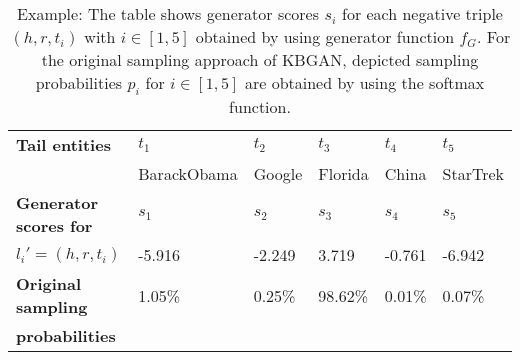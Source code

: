 \begin{table}[h]
    \centering
    \begin{tabular}{llllll}
        \toprule
        
        \textbf{Tail entities}
        & \textbf{$t_1$} & \textbf{$t_2$} & \textbf{$t_3$} & \textbf{$t_4$} & \textbf{$t_5$} \\
         
        & BarackObama 
        & Google 
        & Florida
        & China 
        & StarTrek \\

        \midrule
        
        \textbf{Generator scores for}
        & $s_1$ & $s_2$ & $s_3$ & $s_4$ & $s_5$ \\
       
        
        \textbf{$l_i' = (h, r, t_i)$}
        & -5.916 
        & -2.249  
        & 3.719 
        & -0.761 
        & -6.942 \\
        
         \midrule
        
        \textbf{Original sampling}
         & 1.05\%
        & 0.25\% 
        & 98.62\%  
        & 0.01\% 
        & 0.07\% \\
        
       \textbf{probabilities} 
       & & &  & &  \\
        \bottomrule
    \end{tabular}
    \caption{Example: The table shows generator scores 
    $s_i$ for each negative triple $(h,r,t_i)$ with $i \in [1,5]$ obtained by using generator function $f_G$.
    For the original sampling approach of \textsc{KBGAN}, depicted sampling probabilities $p_i$ for $i \in [1,5]$ are obtained by using the softmax function.}
\label{tab:generator_scores}
\end{table}